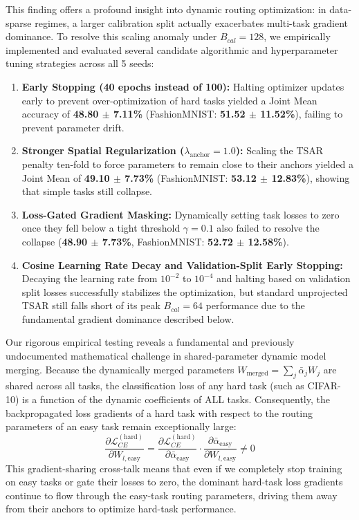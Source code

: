 This finding offers a profound insight into dynamic routing optimization: in data-sparse regimes, a
larger calibration split actually exacerbates multi-task gradient dominance. To resolve this scaling
anomaly under $B_{cal}=128$, we empirically implemented and evaluated several candidate algorithmic
and hyperparameter tuning strategies across all 5 seeds:
\begin{enumerate}
  \item \textbf{Early Stopping (40 epochs instead of 100):} Halting optimizer updates early to
prevent over-optimization of hard tasks yielded a Joint Mean accuracy of \textbf{48.80 $\pm$ 7.11\%}
(FashionMNIST: \textbf{51.52 $\pm$ 11.52\%}), failing to prevent parameter drift.
  \item \textbf{Stronger Spatial Regularization ($\lambda_{\text{anchor}}=1.0$):} Scaling the TSAR
penalty ten-fold to force parameters to remain close to their anchors yielded a Joint Mean of
\textbf{49.10 $\pm$ 7.73\%} (FashionMNIST: \textbf{53.12 $\pm$ 12.83\%}), showing that simple tasks
still collapse.
  \item \textbf{Loss-Gated Gradient Masking:} Dynamically setting task losses to zero once they
fell below a tight threshold $\gamma = 0.1$ also failed to resolve the collapse (\textbf{48.90 $\pm$
7.73\%}, FashionMNIST: \textbf{52.72 $\pm$ 12.58\%}).
  \item \textbf{Cosine Learning Rate Decay and Validation-Split Early Stopping:} Decaying the
learning rate from $10^{-2}$ to $10^{-4}$ and halting based on validation split losses successfully
stabilizes the optimization, but standard unprojected TSAR still falls short of its peak
$B_{cal}=64$ performance due to the fundamental gradient dominance described below.
\end{enumerate}

Our rigorous empirical testing reveals a fundamental and previously undocumented mathematical
challenge in shared-parameter dynamic model merging. Because the dynamically merged parameters
$W_{\text{merged}} = \sum_j \bar{\alpha}_j W_j$ are shared across all tasks, the classification loss
of any hard task (such as CIFAR-10) is a function of the dynamic coefficients of ALL tasks.
Consequently, the backpropagated loss gradients of a hard task with respect to the routing
parameters of an easy task remain exceptionally large:
\begin{equation}
\frac{\partial \mathcal{L}_{CE}^{(\text{hard})}}{\partial W_{l, \text{easy}}} = \frac{\partial \mathcal{L}_{CE}^{(\text{hard})}}{\partial \bar{\alpha}_{\text{easy}}} \cdot \frac{\partial \bar{\alpha}_{\text{easy}}}{\partial W_{l, \text{easy}}} \ne 0
\label{eq:grad_crosstalk}
\end{equation}
This gradient-sharing cross-talk means that even if we completely stop training on easy tasks or
gate their losses to zero, the dominant hard-task loss gradients continue to flow through the
easy-task routing parameters, driving them away from their anchors to optimize hard-task
performance. 

